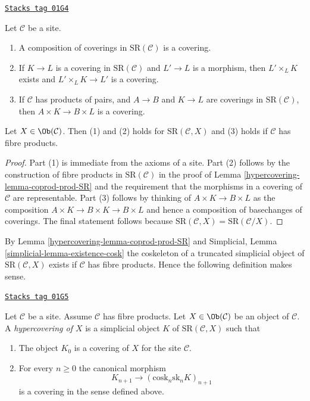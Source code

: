 \begin{lemma}
\label{hypercovering-lemma-covering-permanence}
\href{https://stacks.math.columbia.edu/tag/01G4}{\texttt{Stacks tag 01G4}}

Let $\mathcal{C}$ be a site.
\begin{enumerate}
\item A composition of coverings in $\text{SR}(\mathcal{C})$
is a covering.
\item If $K \to L$ is a covering in $\text{SR}(\mathcal{C})$
and $L' \to L$ is a morphism, then $L' \times_L K$ exists
and $L' \times_L K \to L'$ is a covering.
\item If $\mathcal{C}$ has products of pairs, and
$A \to B$ and $K \to L$ are coverings in $\text{SR}(\mathcal{C})$,
then $A \times K \to B \times L$ is a covering.
\end{enumerate}
Let $X \in \Ob(\mathcal{C})$. Then (1) and (2) holds for
$\text{SR}(\mathcal{C}, X)$ and (3) holds if $\mathcal{C}$
has fibre products.
\end{lemma}

\begin{proof}

Part (1) is immediate from the axioms of a site.
Part (2) follows by the construction of fibre products
in $\text{SR}(\mathcal{C})$ in the proof of
Lemma \ref{hypercovering-lemma-coprod-prod-SR}
and the requirement that the morphisms in a covering
of $\mathcal{C}$ are representable.
Part (3) follows by thinking of $A \times K \to B \times L$
as the composition $A \times K \to B \times K \to B \times L$
and hence a composition of basechanges of coverings.
The final statement follows because $\text{SR}(\mathcal{C}, X) =
\text{SR}(\mathcal{C}/X)$.
\end{proof}

By Lemma \ref{hypercovering-lemma-coprod-prod-SR} and
Simplicial, Lemma \ref{simplicial-lemma-existence-cosk}
the coskeleton of a truncated simplicial object of
$\text{SR}(\mathcal{C}, X)$ exists if $\mathcal{C}$ has fibre products.
Hence the following definition makes sense.

\begin{definition}[Hypercovering]
\label{hypercovering-definition-hypercovering}
\href{https://stacks.math.columbia.edu/tag/01G5}{\texttt{Stacks tag 01G5}}

Let $\mathcal{C}$ be a site. Assume $\mathcal{C}$ has fibre products.
Let $X \in \Ob(\mathcal{C})$ be an object of $\mathcal{C}$.
A {\it hypercovering of $X$} is a simplicial object
$K$ of $\text{SR}(\mathcal{C}, X)$ such that
\begin{enumerate}
\item The object $K_0$ is a covering of $X$ for the site $\mathcal{C}$.
\item For every $n \geq 0$ the canonical morphism
$$
K_{n + 1} \longrightarrow (\text{cosk}_n \text{sk}_n K)_{n + 1}
$$
is a covering in the sense defined above.
\end{enumerate}
\end{definition}

